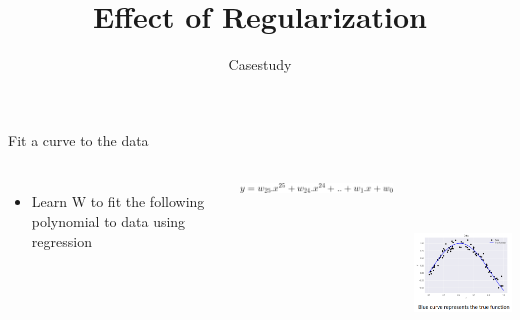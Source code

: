 \documentclass[aspectratio=169,14pt,usenames,dvipsnames]{beamer}
\begin{document}
{\1
\begin{frame} \vspace{35pt}
	\title[Effect of Regularization]{Effect of Regularization}
	\subtitle{Casestudy}
	\maketitle
\end{frame}
}


\begin{frame}[t]{\hspace{3ex} Fit a curve to the data}
\begin{columns}

\begin{itemize}
\item Learn W to fit the following polynomial to data using regression
\end{itemize} 
\includegraphics{Images/AIML_OFG_25.png}

\includegraphics[width=5.5cm, height=5cm]{Images/AIML_OFG_21.png}
\end{columns}

\end{frame}
\end{document}
